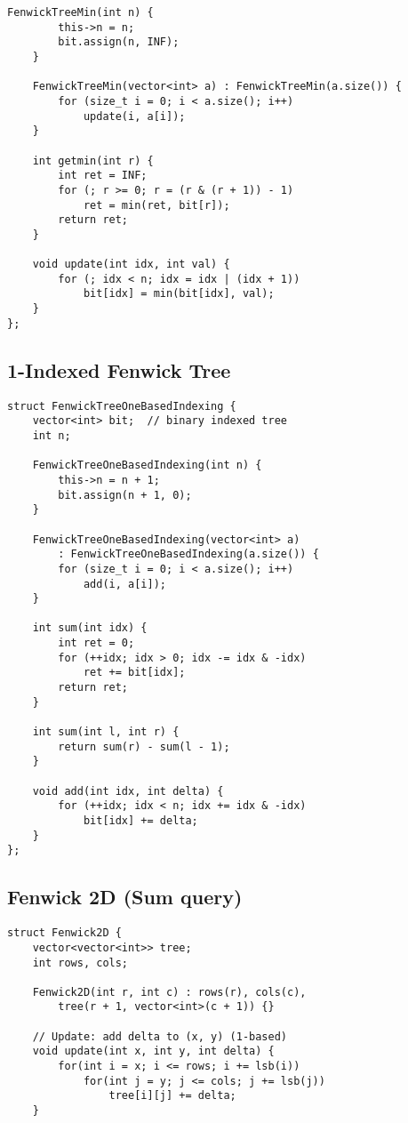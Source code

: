 \documentclass[10pt]{article}
\begin{document}
\begin{multicols*}{2}
\begin{lstlisting}[style=compactcpp]
    FenwickTreeMin(int n) {
        this->n = n;
        bit.assign(n, INF);
    }

    FenwickTreeMin(vector<int> a) : FenwickTreeMin(a.size()) {
        for (size_t i = 0; i < a.size(); i++)
            update(i, a[i]);
    }

    int getmin(int r) {
        int ret = INF;
        for (; r >= 0; r = (r & (r + 1)) - 1)
            ret = min(ret, bit[r]);
        return ret;
    }

    void update(int idx, int val) {
        for (; idx < n; idx = idx | (idx + 1))
            bit[idx] = min(bit[idx], val);
    }
};
\end{lstlisting}

\subsection{1-Indexed Fenwick Tree}

\begin{lstlisting}[style=compactcpp]
struct FenwickTreeOneBasedIndexing {
    vector<int> bit;  // binary indexed tree
    int n;

    FenwickTreeOneBasedIndexing(int n) {
        this->n = n + 1;
        bit.assign(n + 1, 0);
    }

    FenwickTreeOneBasedIndexing(vector<int> a)
        : FenwickTreeOneBasedIndexing(a.size()) {
        for (size_t i = 0; i < a.size(); i++)
            add(i, a[i]);
    }

    int sum(int idx) {
        int ret = 0;
        for (++idx; idx > 0; idx -= idx & -idx)
            ret += bit[idx];
        return ret;
    }

    int sum(int l, int r) {
        return sum(r) - sum(l - 1);
    }

    void add(int idx, int delta) {
        for (++idx; idx < n; idx += idx & -idx)
            bit[idx] += delta;
    }
};
\end{lstlisting}

\subsection{Fenwick 2D (Sum query)}
\begin{lstlisting}[style=compactcpp]
struct Fenwick2D {
    vector<vector<int>> tree;
    int rows, cols;
    
    Fenwick2D(int r, int c) : rows(r), cols(c), 
        tree(r + 1, vector<int>(c + 1)) {}
    
    // Update: add delta to (x, y) (1-based)
    void update(int x, int y, int delta) {
        for(int i = x; i <= rows; i += lsb(i))
            for(int j = y; j <= cols; j += lsb(j))
                tree[i][j] += delta;
    }
    

\end{lstlisting}
\end{multicols*}
\end{document}
